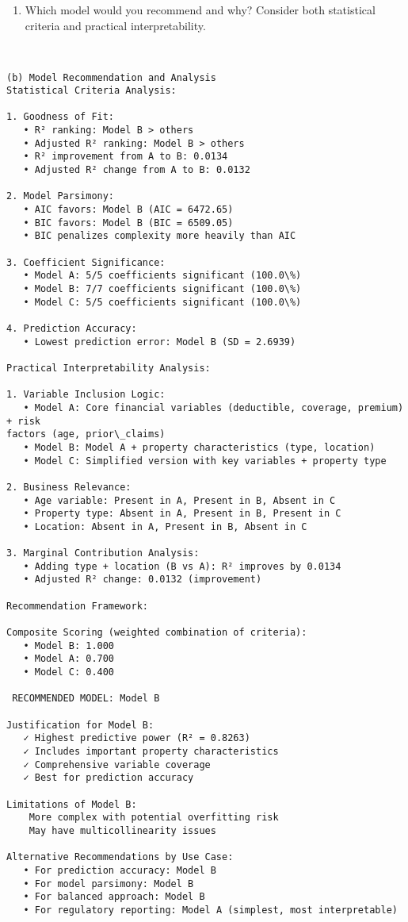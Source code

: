 \documentclass[8pt, twocolumn]{extarticle}
\providecommand{\tightlist}{%
      \setlength{\itemsep}{0pt}\setlength{\parskip}{0pt}}
\begin{document}
    \begin{enumerate}
\def\labelenumi{(\alph{enumi})}
\setcounter{enumi}{1}
\tightlist
\item
  Which model would you recommend and why? Consider both statistical
  criteria and practical interpretability.
\end{enumerate}

    \begin{Verbatim}[commandchars=\\\{\}]


(b) Model Recommendation and Analysis
Statistical Criteria Analysis:

1. Goodness of Fit:
   • R² ranking: Model B > others
   • Adjusted R² ranking: Model B > others
   • R² improvement from A to B: 0.0134
   • Adjusted R² change from A to B: 0.0132

2. Model Parsimony:
   • AIC favors: Model B (AIC = 6472.65)
   • BIC favors: Model B (BIC = 6509.05)
   • BIC penalizes complexity more heavily than AIC

3. Coefficient Significance:
   • Model A: 5/5 coefficients significant (100.0\%)
   • Model B: 7/7 coefficients significant (100.0\%)
   • Model C: 5/5 coefficients significant (100.0\%)

4. Prediction Accuracy:
   • Lowest prediction error: Model B (SD = 2.6939)

Practical Interpretability Analysis:

1. Variable Inclusion Logic:
   • Model A: Core financial variables (deductible, coverage, premium) + risk
factors (age, prior\_claims)
   • Model B: Model A + property characteristics (type, location)
   • Model C: Simplified version with key variables + property type

2. Business Relevance:
   • Age variable: Present in A, Present in B, Absent in C
   • Property type: Absent in A, Present in B, Present in C
   • Location: Absent in A, Present in B, Absent in C

3. Marginal Contribution Analysis:
   • Adding type + location (B vs A): R² improves by 0.0134
   • Adjusted R² change: 0.0132 (improvement)

Recommendation Framework:

Composite Scoring (weighted combination of criteria):
   • Model B: 1.000
   • Model A: 0.700
   • Model C: 0.400

 RECOMMENDED MODEL: Model B

Justification for Model B:
   ✓ Highest predictive power (R² = 0.8263)
   ✓ Includes important property characteristics
   ✓ Comprehensive variable coverage
   ✓ Best for prediction accuracy

Limitations of Model B:
    More complex with potential overfitting risk
    May have multicollinearity issues

Alternative Recommendations by Use Case:
   • For prediction accuracy: Model B
   • For model parsimony: Model B
   • For balanced approach: Model B
   • For regulatory reporting: Model A (simplest, most interpretable)
    \end{Verbatim}
\end{document}
